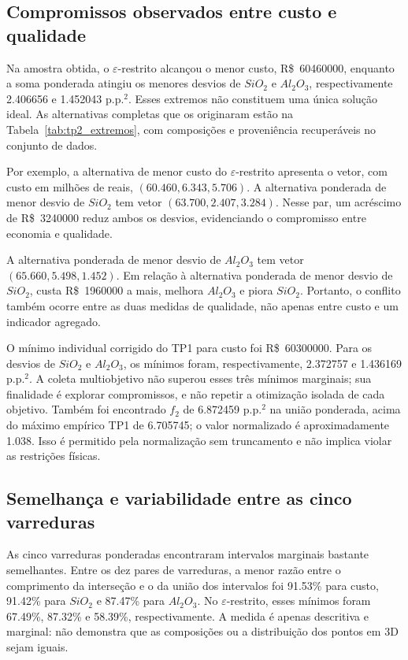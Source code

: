 \subsection{Compromissos observados entre custo e qualidade}

Na amostra obtida, o $\varepsilon$-restrito alcançou o menor custo,
R\$~\num{60460000}, enquanto a soma ponderada atingiu os menores desvios
de $SiO_2$ e $Al_2O_3$, respectivamente \num{2.406656} e \num{1.452043}
p.p.$^2$. Esses extremos não constituem uma única solução ideal. As
alternativas completas que os originaram estão na
Tabela~\ref{tab:tp2_extremos}, com composições e proveniência recuperáveis
no conjunto de dados.

Por exemplo, a alternativa de menor custo do $\varepsilon$-restrito
apresenta o vetor, com custo em milhões de reais,
$(\num{60.460},\num{6.343},\num{5.706})$. A alternativa ponderada de menor
desvio de $SiO_2$ tem vetor
$(\num{63.700},\num{2.407},\num{3.284})$.
Nesse par, um acréscimo de R\$~\num{3240000} reduz ambos os desvios,
evidenciando o compromisso entre economia e qualidade.

A alternativa ponderada de menor desvio de $Al_2O_3$ tem vetor
$(\num{65.660},\num{5.498},\num{1.452})$.
Em relação à alternativa ponderada de menor desvio de $SiO_2$, custa
R\$~\num{1960000} a mais, melhora $Al_2O_3$ e piora $SiO_2$.
Portanto, o conflito também ocorre entre as duas medidas de qualidade,
não apenas entre custo e um indicador agregado.

O mínimo individual corrigido do TP1 para custo foi R\$~\num{60300000}.
Para os desvios de $SiO_2$ e $Al_2O_3$, os mínimos foram, respectivamente,
\num{2.372757} e \num{1.436169} p.p.$^2$. A coleta multiobjetivo não
superou esses três mínimos marginais; sua finalidade é explorar
compromissos, e não repetir a otimização isolada de cada objetivo.
Também foi encontrado $f_2$ de \num{6.872459} p.p.$^2$ na união ponderada,
acima do máximo empírico TP1 de \num{6.705745}; o valor normalizado é
aproximadamente \num{1.038}. Isso é permitido pela normalização sem
truncamento e não implica violar as restrições físicas.

\subsection{Semelhança e variabilidade entre as cinco varreduras}

As cinco varreduras ponderadas encontraram intervalos marginais bastante
semelhantes. Entre os dez pares de varreduras, a menor razão entre o
comprimento da interseção e o da união dos intervalos foi
\num{91.53}\% para custo, \num{91.42}\% para $SiO_2$ e \num{87.47}\%
para $Al_2O_3$. No $\varepsilon$-restrito, esses mínimos foram
\num{67.49}\%, \num{87.32}\% e \num{58.39}\%, respectivamente.
A medida é apenas descritiva e marginal: não demonstra que as composições
ou a distribuição dos pontos em 3D sejam iguais.

